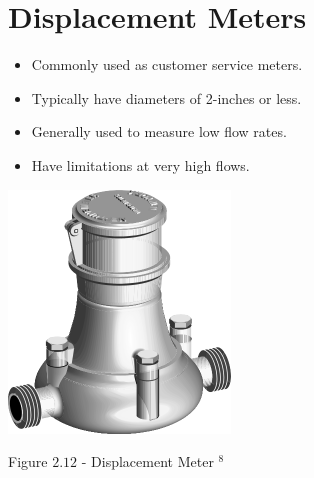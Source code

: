 \documentclass[10pt]{article}
\begin{document}
\section{Displacement Meters}
\begin{itemize}
  \item Commonly used as customer service meters.

  \item Typically have diameters of 2-inches or less.

  \item Generally used to measure low flow rates.

  \item Have limitations at very high flows.

\end{itemize}
\includegraphics[max width=\textwidth]{DisplacementMeter}

Figure $2.12$ - Displacement Meter ${ }^{8}$
\end{document}
